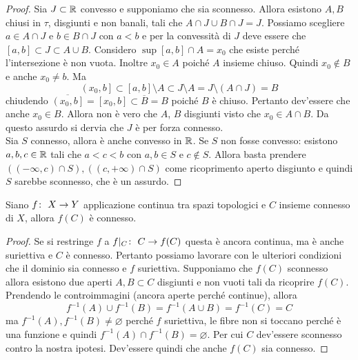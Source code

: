 \begin{proof}
	Sia $J \subset \mathbb{R}$ convesso e supponiamo che sia sconnesso. Allora esistono $A, B$ chiusi in $\tau$, disgiunti e non banali, tali che $A \cap J \cup B \cap J = J$. Possiamo scegliere $a \in A \cap J$ e $b \in B \cap J$ con $a < b$ e per la convessità di $J$ deve essere che $\left[a,b\right] \subset J \subset A \cup B$. Considero $\sup \left[a,b\right] \cap A = x_0$ che esiste perché l'intersezione è non vuota. Inoltre $x_0 \in A$ poiché $A$ insieme chiuso. Quindi $x_0 \notin B$ e anche $x_0 \neq b$. Ma 
	\begin{equation*}
		\left(x_0, b\right] \subset \left[a,b\right] \setminus A \subset J \setminus A =  J \setminus (A \cap J) = B
	\end{equation*}
	chiudendo $\overline{\left(x_0, b\right]} = \left[x_0, b\right] \subset \overline{B} = B$ poiché $B$ è chiuso. Pertanto dev'essere che anche $x_0 \in B$. Allora non è vero che $A$, $B$ disgiunti visto che $x_0 \in A \cap B$. Da questo assurdo si dervia che $J$ è per forza connesso.\\
	
	Sia $S$ connesso, allora è anche convesso in $\mathbb{R}$. Se $S$ non fosse convesso: esistono $a,b,c \in \mathbb{R}$ tali che $a < c < b$ con $a,b \in S$ e $c \notin S$. Allora basta prendere $((-\infty, c) \cap S), ((c, +\infty) \cap S)$ come ricoprimento aperto disgiunto e quindi $S$ sarebbe sconnesso, che è un assurdo.
\end{proof}

\begin{theorem}
	\label{thr:3.21.3}
	Siano $f \colon\ X \rightarrow Y$ applicazione continua tra spazi topologici e $C$ insieme connesso di $X$, allora $f(C)$ è connesso. 
\end{theorem} 
\begin{proof}
	Se si restringe $f$ a $f|_C \colon\ C \rightarrow f(C)$ questa è ancora continua, ma è anche suriettiva e $C$ è connesso. Pertanto possiamo lavorare con le ulteriori condizioni che il dominio sia connesso e $f$ suriettiva. Supponiamo che $f(C)$ sconnesso allora esistono due aperti $A, B \subset C$ disgiunti e non vuoti tali da ricoprire $f(C)$. Prendendo le controimmagini (ancora aperte perché continue), allora 
	\begin{equation*}
		f^{-1}(A) \cup f^{-1}(B) = f^{-1}(A \cup B) = f^{-1}(C) = C
	\end{equation*}
	ma $f^{-1}(A), f^{-1}(B) \neq \varnothing$ perché $f$ suriettiva, le fibre non si toccano perché è una funzione e quindi $f^{-1}(A) \cap f^{-1}(B) = \varnothing$. Per cui $C$ dev'essere sconnesso contro la nostra ipotesi. Dev'essere quindi che anche $f(C)$ sia connesso.
\end{proof}

